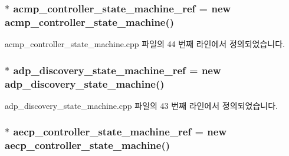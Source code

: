 \subsubsection[{\texorpdfstring{acmp\+\_\+controller\+\_\+state\+\_\+machine\+\_\+ref}{acmp_controller_state_machine_ref}}]{ $\ast$ acmp\+\_\+controller\+\_\+state\+\_\+machine\+\_\+ref = new {\bf acmp\+\_\+controller\+\_\+state\+\_\+machine}()}\hypertarget{namespaceavdecc__lib_a693c2049de1d4ec860a92126b846ac21}{}\label{namespaceavdecc__lib_a693c2049de1d4ec860a92126b846ac21}


acmp\+\_\+controller\+\_\+state\+\_\+machine.\+cpp 파일의 44 번째 라인에서 정의되었습니다.

\subsubsection[{\texorpdfstring{adp\+\_\+discovery\+\_\+state\+\_\+machine\+\_\+ref}{adp_discovery_state_machine_ref}}]{ $\ast$ adp\+\_\+discovery\+\_\+state\+\_\+machine\+\_\+ref = new {\bf adp\+\_\+discovery\+\_\+state\+\_\+machine}()}\hypertarget{namespaceavdecc__lib_aa33697f1203280924134bb7fdcc76129}{}\label{namespaceavdecc__lib_aa33697f1203280924134bb7fdcc76129}


adp\+\_\+discovery\+\_\+state\+\_\+machine.\+cpp 파일의 43 번째 라인에서 정의되었습니다.

\subsubsection[{\texorpdfstring{aecp\+\_\+controller\+\_\+state\+\_\+machine\+\_\+ref}{aecp_controller_state_machine_ref}}]{ $\ast$ aecp\+\_\+controller\+\_\+state\+\_\+machine\+\_\+ref = new {\bf aecp\+\_\+controller\+\_\+state\+\_\+machine}()}\hypertarget{namespaceavdecc__lib_a0b1b5aea3c0490f77cbfd9178af5be22}{}\label{namespaceavdecc__lib_a0b1b5aea3c0490f77cbfd9178af5be22}


